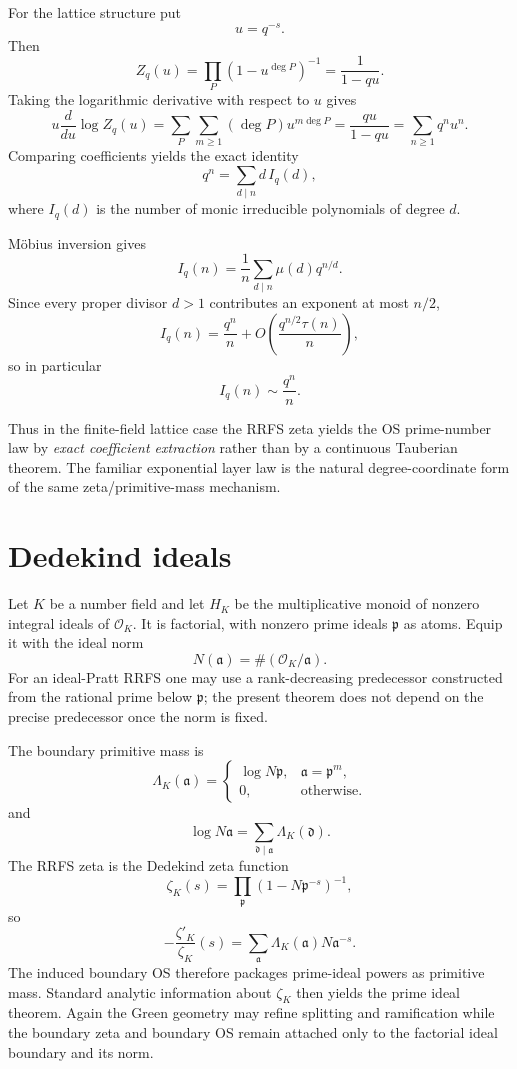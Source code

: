 \documentclass[11pt]{article}
\begin{document}
For the lattice structure put
\[
u=q^{-s}.
\]
Then
\begin{equation}\label{eq:fqzeta}
Z_q(u)=\prod_P(1-u^{\deg P})^{-1}=\frac{1}{1-qu}.
\end{equation}
Taking the logarithmic derivative with respect to $u$ gives
\[
u\frac{d}{du}\log Z_q(u)
=\sum_P\sum_{m\ge1}(\deg P)u^{m\deg P}
=\frac{qu}{1-qu}
=\sum_{n\ge1}q^n u^n.
\]
Comparing coefficients yields the exact identity
\begin{equation}\label{eq:coeff}
\boxed{
q^n=\sum_{d\mid n} d\,I_q(d),}
\end{equation}
where $I_q(d)$ is the number of monic irreducible polynomials of degree $d$.

M\"obius inversion gives
\begin{equation}\label{eq:iq}
\boxed{
I_q(n)=\frac1n\sum_{d\mid n}\mu(d)q^{n/d}.}
\end{equation}
Since every proper divisor $d>1$ contributes an exponent at most $n/2$,
\[
I_q(n)=\frac{q^n}{n}+O\!\left(\frac{q^{n/2}\tau(n)}{n}\right),
\]
so in particular
\[
\boxed{I_q(n)\sim\frac{q^n}{n}.}
\]

Thus in the finite-field lattice case the RRFS zeta yields the OS prime-number law by \emph{exact coefficient extraction} rather than by a continuous Tauberian theorem. The familiar exponential layer law is the natural degree-coordinate form of the same zeta/primitive-mass mechanism.

\section{Dedekind ideals}

Let $K$ be a number field and let $H_K$ be the multiplicative monoid of nonzero integral ideals of $\mathcal O_K$. It is factorial, with nonzero prime ideals $\mathfrak p$ as atoms. Equip it with the ideal norm
\[
N(\mathfrak a)=\#(\mathcal O_K/\mathfrak a).
\]
For an ideal-Pratt RRFS one may use a rank-decreasing predecessor constructed from the rational prime below $\mathfrak p$; the present theorem does not depend on the precise predecessor once the norm is fixed.

The boundary primitive mass is
\[
\Lambda_K(\mathfrak a)=
\begin{cases}
\log N\mathfrak p,&\mathfrak a=\mathfrak p^m,\\
0,&\text{otherwise}.
\end{cases}
\]
and
\[
\log N\mathfrak a=\sum_{\mathfrak d\mid\mathfrak a}\Lambda_K(\mathfrak d).
\]
The RRFS zeta is the Dedekind zeta function
\[
\zeta_K(s)
=\prod_{\mathfrak p}
(1-N\mathfrak p^{-s})^{-1},
\]
so
\[
-\frac{\zeta'_K}{\zeta_K}(s)
=\sum_{\mathfrak a}\Lambda_K(\mathfrak a)N\mathfrak a^{-s}.
\]
The induced boundary OS therefore packages prime-ideal powers as primitive mass. Standard analytic information about $\zeta_K$ then yields the prime ideal theorem. Again the Green geometry may refine splitting and ramification while the boundary zeta and boundary OS remain attached only to the factorial ideal boundary and its norm.
\end{document}
